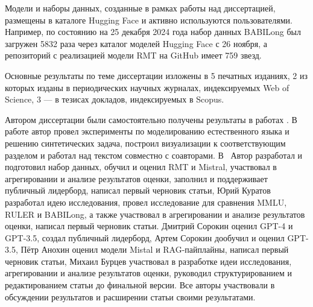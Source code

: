 Модели и наборы данных, созданные в рамках работы над диссертацией, размещены в каталоге Hugging Face и активно используются пользователями. Например, по состоянию на 25 декабря 2024 года набор данных BABILong был загружен 5832 раза через каталог моделей Hugging Face с 26 ноября, а репозиторий с реализацией модели RMT на GitHub имеет 759 звезд.

{\publications} Основные результаты по теме диссертации изложены в 5 печатных изданиях, 2 из которых изданы в периодических научных журналах, индексируемых Web of Science, 3 — в тезисах докладов, индексируемых в Scopus.

{\contribution} Автором диссертации были самостоятельно получены результаты в работах \cite{bulatov2022recurrent}.
В работе \cite{bulatov2023scaling} автор провел эксперименты по моделированию естественного языка и решению синтетических задача, построил визуализации к соответствующим разделом и работал над текстом совместно с соавторами. В~\cite{kuratov2024babilong} %
Автор разработал и подготовил набор данных, обучил и оценил RMT и Mistral, участвовал в агрегировании и анализе результатов оценки, заполнил и поддерживает публичный лидерборд, написал первый черновик статьи, Юрий Куратов разработал идею исследования, провел исследование для сравнения MMLU, RULER и BABILong, а также участвовал в агрегировании и анализе результатов оценки, написал первый черновик статьи. Дмитрий Сорокин оценил GPT-4 и GPT-3.5, создал публичный лидерборд, Артем Сорокин дообучил и оценил GPT-3.5, Пётр Анохин оценил модели Mistal и RAG-пайплайны, написал первый черновик статьи, Михаил Бурцев участвовал в разработке  идеи исследования, агрегировании и анализе результатов оценки, руководил структурированием и редактированием статьи до финальной версии. Все авторы участвовали в обсуждении результатов и расширении статьи своими результатами.



